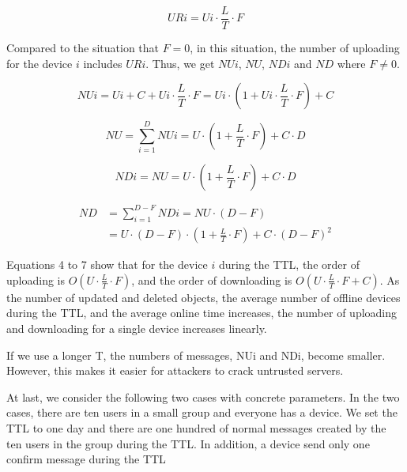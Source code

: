 \documentclass[twocolumn,10pt]{article}
\begin{document}
\begin{equation}
URi = Ui \cdot \frac{L}{T} \cdot F
\end{equation}

Compared to the situation that $F=0$, in this situation, the number of uploading for the device $i$ includes $URi$.
Thus, we get $NUi$, $NU$, $NDi$ and $ND$ where $F \neq 0$.

\begin{equation}
NUi = Ui + C + Ui \cdot \frac{L}{T} \cdot F = Ui \cdot (1 + Ui \cdot \frac{L}{T} \cdot F) + C
\end{equation}

\begin{equation}
NU = \sum_{i=1}^{D} NUi = U \cdot (1 + \frac{L}{T} \cdot F) + C \cdot D
\end{equation}

\begin{equation}
NDi = NU = U \cdot (1 + \frac{L}{T} \cdot F) + C \cdot D
\end{equation}

\begin{equation}
\begin{aligned}
ND &= \sum_{i=1}^{D - F} NDi = NU \cdot (D - F) \\&= U \cdot (D - F) \cdot (1 + \frac{L}{T} \cdot F) + C \cdot (D - F) ^{2}
\end{aligned}
\end{equation}

Equations 4 to 7 show that for the device $i$ during the TTL, the order of uploading is $O(U \cdot \frac{L}{T} \cdot F)$, and the order of downloading is $O(U \cdot \frac{L}{T} \cdot F + C)$.
As the number of updated and deleted objects, the average number of offline devices during the TTL, and the average online time increases, the number of uploading and downloading for a single device increases linearly.

If we use a longer T, the numbers of messages, NUi and NDi, become smaller.
However, this makes it easier for attackers to crack untrusted servers.

At last, we consider the following two cases with concrete parameters.
In the two cases, there are ten users in a small group and everyone has a device.
We set the TTL to one day and there are one hundred of normal messages created by the ten users in the group during the TTL.
In addition, a device send only one confirm message during the TTL
\end{document}
